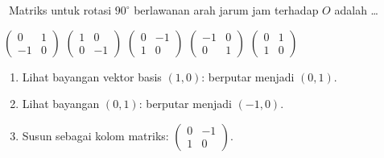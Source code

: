 \documentclass[11pt,a4paper]{exam}
\newenvironment{langkah}{%
  \begin{enumerate}[label=\textbf{Langkah \arabic*:},leftmargin=2.6em,
    itemsep=2pt,topsep=2pt]}{\end{enumerate}}
\newcommand{\Adv}{{\footnotesize\textsf{\textcolor{oranye}{[Advanced]}}}\ }
\begin{document}
\begin{questions}
\question \Adv Matriks untuk rotasi $90^\circ$ berlawanan arah jarum jam terhadap
$O$ adalah \dots
\begin{choices}
\choice $\begin{pmatrix} 0 & 1\\ -1 & 0 \end{pmatrix}$
\choice $\begin{pmatrix} 1 & 0\\ 0 & -1 \end{pmatrix}$
\CorrectChoice $\begin{pmatrix} 0 & -1\\ 1 & 0 \end{pmatrix}$
\choice $\begin{pmatrix} -1 & 0\\ 0 & 1 \end{pmatrix}$
\choice $\begin{pmatrix} 0 & 1\\ 1 & 0 \end{pmatrix}$
\end{choices}
\begin{solution}
\begin{langkah}
\item Lihat bayangan vektor basis $(1,0)$: berputar menjadi $(0,1)$.
\item Lihat bayangan $(0,1)$: berputar menjadi $(-1,0)$.
\item Susun sebagai kolom matriks: $\begin{pmatrix} 0 & -1\\ 1 & 0 \end{pmatrix}$.
\end{langkah}
\end{solution}


\end{questions}
\end{document}
